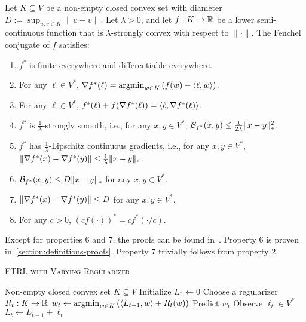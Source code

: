 \begin{proposition}
\label{proposition:conjugate-properties}
Let $K \subseteq V$ be a non-empty closed convex set with diameter
$D:=\sup_{u,v \in K} \|u-v\|$.  Let $\lambda > 0$, and let $f:K \to \mathbb{R}$ be a
lower semi-continuous function that is $\lambda$-strongly convex with respect
to $\|\cdot\|$.  The Fenchel conjugate of $f$ satisfies:
\begin{enumerate}

\item $f^*$ is finite everywhere and differentiable everywhere.

\item For any $\ell \in V^*$, $\nabla f^*(\ell) = \operatorname*{argmin}_{w \in K} \left( f(w) - \langle \ell, w \rangle \right)$.

\item For any $\ell \in V^*$, $f^*(\ell) + f(\nabla f^*(\ell)) = \langle \ell, \nabla f^*(\ell) \rangle$.

\item $f^*$ is $\frac{1}{\lambda}$-strongly smooth, i.e., for any $x,y \in
V^*$, $\mathcal{B}_{f^*}(x, y) \le \frac{1}{2\lambda} \|x - y\|_*^2$.

\item $f^*$ has $\frac{1}{\lambda}$-Lipschitz continuous gradients, i.e.,
for any $x,y \in V^*$,
$\|\nabla f^*(x) - \nabla f^*(y)\| \le \frac{1}{\lambda} \|x - y\|_*$.

\item $\mathcal{B}_{f^*}(x,y) \le D\|x-y\|_*$ for any $x,y \in V^*$.

\item $\|\nabla f^*(x) - \nabla f^*(y)\| \le D$ for any $x,y \in V^*$.

\item For any $c > 0$, $(cf(\cdot))^* = cf^*(\cdot/c)$.
\end{enumerate}
\end{proposition}

Except for properties 6 and 7, the proofs can be found
in~\cite{Shalev-Shwartz-2007}.  Property 6 is proven
in~\ref{section:definitions-proofs}. Property 7 trivially follows from property
2.

\begin{algorithm}[t]
\caption{\textsc{FTRL with Varying Regularizer}}
\label{algorithm:ftrl-varying-regularizer}
\begin{algorithmic}[1]
\REQUIRE Non-empty closed convex set $K \subseteq V$
\STATE Initialize $L_0 \leftarrow 0$
\STATE Choose a regularizer $R_t:K \to \mathbb{R}$
\STATE $w_t \leftarrow \operatorname*{argmin}_{w \in K} \left( \langle L_{t-1}, w \rangle + R_t(w) \right)$
\STATE Predict $w_t$
\STATE Observe $\ell_t \in V^*$
\STATE $L_t \leftarrow L_{t-1} + \ell_t$
\ENDFOR
\end{algorithmic}
\end{algorithm}


